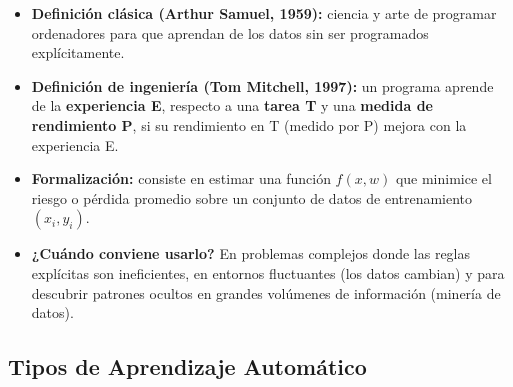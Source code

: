 \documentclass[12pt]{book} %
\providecommand{\tightlist}{%
  \setlength{\itemsep}{0pt}\setlength{\parskip}{0pt}}
\begin{document}
\begin{itemize}
\tightlist
\item
  \textbf{Definición clásica (Arthur Samuel, 1959):} ciencia y arte de
  programar ordenadores para que aprendan de los datos sin ser
  programados explícitamente.
\item
  \textbf{Definición de ingeniería (Tom Mitchell, 1997):} un programa
  aprende de la \textbf{experiencia E}, respecto a una \textbf{tarea T}
  y una \textbf{medida de rendimiento P}, si su rendimiento en T (medido
  por P) mejora con la experiencia E.
\item
  \textbf{Formalización:} consiste en estimar una función \(f(x, w)\)
  que minimice el riesgo o pérdida promedio sobre un conjunto de datos
  de entrenamiento \((x_i, y_i)\).
\item
  \textbf{¿Cuándo conviene usarlo?} En problemas complejos donde las
  reglas explícitas son ineficientes, en entornos fluctuantes (los datos
  cambian) y para descubrir patrones ocultos en grandes volúmenes de
  información (minería de datos).
\end{itemize}

\hypertarget{tipos-de-aprendizaje-automuxe1tico}{%
\subsection{Tipos de Aprendizaje
Automático}\label{tipos-de-aprendizaje-automuxe1tico}}
\end{document}
